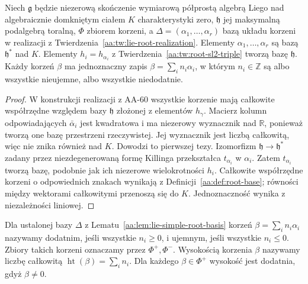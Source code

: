 \begin{lemat}
\label{aa:lem:lie-simple-root-basis}
Niech $\mathfrak g$ będzie niezerową skończenie wymiarową półprostą algebrą Liego nad algebraicznie domkniętym ciałem $K$ charakterystyki zero, $\mathfrak h$ jej maksymalną podalgebrą toralną, $\Phi$ zbiorem korzeni, a $\Delta=(\alpha_1,\ldots,\alpha_r)$ bazą układu korzeni w realizacji z Twierdzenia~\ref{aa:tw:lie-root-realization}. Elementy $\alpha_1,\ldots,\alpha_r$ są bazą $\mathfrak h^*$ nad $K$. Elementy $h_i=h_{\alpha_i}$ z Twierdzenia~\ref{aa:tw:root-sl2-triple} tworzą bazę $\mathfrak h$. Każdy korzeń $\beta$ ma jednoznaczny zapis $\beta=\sum_i n_i\alpha_i$, w którym $n_i\in\mathbb Z$ są albo wszystkie nieujemne, albo wszystkie niedodatnie.
\end{lemat}
\begin{proof}
W konstrukcji realizacji z AA-60 wszystkie korzenie mają całkowite współrzędne względem bazy $\mathfrak h$ złożonej z elementów $h_\gamma$. Macierz kolumn odpowiadających $\bar\alpha_i$ jest kwadratowa i ma niezerowy wyznacznik nad $\mathbb R$, ponieważ tworzą one bazę przestrzeni rzeczywistej. Jej wyznacznik jest liczbą całkowitą, więc nie znika również nad $K$. Dowodzi to pierwszej tezy. Izomorfizm $\mathfrak h\to\mathfrak h^*$ zadany przez niezdegenerowaną formę Killinga przekształca $t_{\alpha_i}$ w $\alpha_i$. Zatem $t_{\alpha_i}$ tworzą bazę, podobnie jak ich niezerowe wielokrotności $h_i$. Całkowite współrzędne korzeni o odpowiednich znakach wynikają z Definicji~\ref{aa:def:root-base}; równości między wektorami całkowitymi przenoszą się do $K$. Jednoznaczność wynika z niezależności liniowej.
\end{proof}

\begin{definicja}
\label{aa:def:lie-positive-height}
Dla ustalonej bazy $\Delta$ z Lematu~\ref{aa:lem:lie-simple-root-basis} korzeń $\beta=\sum_i n_i\alpha_i$ nazywamy dodatnim, jeśli wszystkie $n_i\ge0$, i ujemnym, jeśli wszystkie $n_i\le0$. Zbiory takich korzeni oznaczamy przez $\Phi^+,\Phi^-$. Wysokością korzenia $\beta$ nazywamy liczbę całkowitą $\operatorname{ht}(\beta)=\sum_i n_i$. Dla każdego $\beta\in\Phi^+$ wysokość jest dodatnia, gdyż $\beta\ne0$.
\end{definicja}

